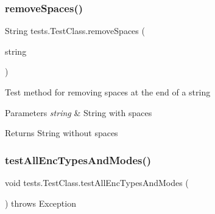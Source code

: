 \subsubsection{\texorpdfstring{remove\+Spaces()}{removeSpaces()}}
{\footnotesize\ttfamily String tests.\+Test\+Class.\+remove\+Spaces (\begin{DoxyParamCaption}\item[{String}]{string }\end{DoxyParamCaption})\hspace{0.3cm}{\ttfamily [private]}}

Test method for removing spaces at the end of a string 
\begin{DoxyParams}{Parameters}
{\em string} & String with spaces \\
\hline
\end{DoxyParams}
\begin{DoxyReturn}{Returns}
String without spaces 
\end{DoxyReturn}
\mbox{\label{classtests_1_1_test_class_a85be535c071d279d8d7bc1a40201dcff}} 
\subsubsection{\texorpdfstring{test\+All\+Enc\+Types\+And\+Modes()}{testAllEncTypesAndModes()}}
{\footnotesize\ttfamily void tests.\+Test\+Class.\+test\+All\+Enc\+Types\+And\+Modes (\begin{DoxyParamCaption}{ }\end{DoxyParamCaption}) throws Exception}

